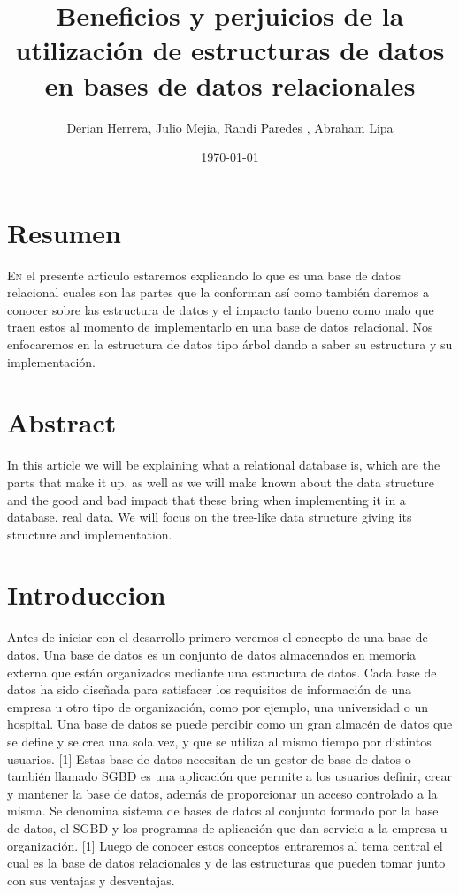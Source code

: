 \documentclass[twoside,twocolumn]{article}
\title{Beneficios y perjuicios de la utilización de estructuras de datos en bases de datos relacionales } %
\author{Derian Herrera, Julio Mejia, Randi Paredes , Abraham Lipa}
\date{\today} %
\begin{document}
\maketitle


\section{Resumen}

\lettrine[nindent=0em,lines=3]{E}n el presente articulo estaremos explicando lo que es una base de datos relacional cuales son las partes que la conforman así como también daremos a conocer sobre las estructura de datos y el impacto tanto bueno como malo que traen estos al momento de implementarlo en una base de datos relacional. Nos enfocaremos en la estructura de datos tipo árbol dando a saber su estructura y su implementación.




\section{Abstract}


In this article we will be explaining what a relational database is, which are the parts that make it up, as well as we will make known about the data structure and the good and bad impact that these bring when implementing it in a database. real data. 
We will focus on the tree-like data structure giving its structure and implementation.






\section{Introduccion}
Antes de iniciar con el desarrollo primero veremos el concepto de una base de datos.
Una base de datos es un conjunto de datos almacenados en memoria externa que están organizados mediante una estructura de datos. Cada base de datos ha sido diseñada para satisfacer los requisitos de información de una empresa u otro tipo de organización, como por ejemplo, una universidad o un hospital.
Una base de datos se puede percibir como un gran almacén de datos que se deﬁne y se crea una sola vez, y que se utiliza al mismo tiempo por distintos usuarios. [1]
Estas base de datos necesitan de un gestor de base de datos o también llamado SGBD es una aplicación que permite a los usuarios deﬁnir, crear y mantener la base de datos, además de proporcionar un acceso controlado a la misma. Se denomina sistema de bases de datos al conjunto formado por la base de datos, el SGBD y los programas de aplicación que dan servicio a la empresa u organización. [1]
Luego de conocer estos conceptos entraremos al tema central el cual es la base de datos relacionales y de las estructuras que pueden tomar junto con sus ventajas y desventajas.
\end{document}

